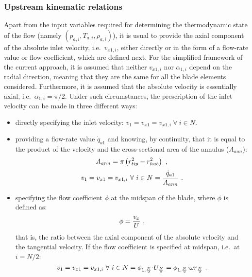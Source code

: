 \subsubsection*{Upstream kinematic relations}{\label{subsubsec:upstream_kinematic_relations}}
Apart from the input variables required for determining the thermodynamic state of the flow (namely $\left(p_{a,i}, T_{a,i}, \rho_{a,i}\right)$), it is usual to provide the axial component of the absolute inlet velocity, i.e.\ $v_{x1,i}$, either directly or in the form of a flow-rate value or flow coefficient, which are defined next. For the simplified framework of the current approach, it is assumed that neither $v_{x1,i}$ nor $\alpha_{1,i}$ depend on the radial direction, meaning that they are the same for all the blade elements considered. Furthermore, it is assumed that the absolute velocity is essentially axial, i.e.\ $\alpha_{1,i}=\pi/2$. Under such circumstances, the prescription of the inlet velocity can be made in three different ways:
\begin{itemize}
	\item{directly specifying the inlet velocity: $v_{1}=v_{x1}=v_{x1,i} \ \forall \ i\in{N}$.}
	\item{providing a flow-rate value $\dot{q}_{a1}$ and knowing, by continuity, that it is equal to the product of the velocity and the cross-sectional area of the annulus ($A_{ann}$):
	\begin{equation}{\label{eq:cross-sectional_area_annulus}}
		A_{ann} = \pi\left(r_{tip}^{2} - r_{hub}^{2}\right) \ ,
	\end{equation}
	\begin{equation}{\label{eq:velocity_from_flow-rate}}
		v_{1}=v_{x1}=v_{x1,i} \ \forall \ i\in{N} = \frac{\dot{q}_{a1}}{A_{ann}} \ .
	\end{equation}
	}
	\item{specifying the flow coefficient $\phi$ at the midspan of the blade, where $\phi$ is defined as:
	\begin{equation}{\label{eq:phi_definition}}
		\phi = \frac{v_{x}}{U} \ ,
	\end{equation}
	that is, the ratio between the axial component of the absolute velocity and the tangential velocity. If the flow coefficient is specified at midspan, i.e.\ at $i=N/2$:
	\begin{equation}{\label{eq:velocity_from_midspan_phi}}
		v_{1}=v_{x1}=v_{x1,i} \ \forall \ i\in{N} = \phi_{1,\frac{N}{2}}{\cdot}U_{\frac{N}{2}} = \phi_{1,\frac{N}{2}}{\cdot}\omega{r_{\frac{N}{2}}} \ .
	\end{equation}
	}
\end{itemize}
